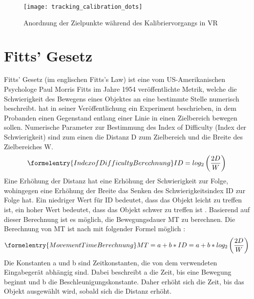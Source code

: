 \begin{figure}[!htbp]
	\centering
	\texttt{[image: tracking\_calibration\_dots]}
	\caption[Anordnung der Zielpunkte während des Kalibriervorgangs in VR]{Anordnung der Zielpunkte während des Kalibriervorgangs in \ac{VR}}
	\label{fig:Calibration-targets}
\end{figure}

\section{Fitts' Gesetz}
\label{section:FittsLaw}
Fitts' Gesetz (im englischen Fitts's Law) ist eine vom US-Amerikanischen Psychologe Paul Morris Fitts im Jahre 1954 veröffentlichte Metrik, welche die Schwierigkeit des Bewegens eines Objektes an eine bestimmte Stelle numerisch beschreibt. \citeauthor{Fitts.1992} hat in seiner Veröffentlichung ein Experiment beschrieben, in dem Probanden einen Gegenstand entlang einer Linie in einen Zielbereich bewegen sollen. Numerische Parameter zur Bestimmung des \glqq Index of Difficulty\grqq{} (Index der Schwierigkeit) sind zum einen die Distanz D zum Zielbereich und die Breite des Zielbereiches W. \cite{Fitts.1992}
\begin{equation}\formelentry{Index of Difficulty Berechnung}
ID = log_2 \left ( \frac{2D}{W} \right )
\end{equation}
Eine Erhöhung der Distanz hat eine Erhöhung der Schwierigkeit zur Folge, wohingegen eine Erhöhung der Breite das Senken des Schwierigkeitsindex ID zur Folge hat. Ein niedriger Wert für ID bedeutet, dass das Objekt leicht zu treffen ist, ein hoher Wert bedeutet, dass das Objekt schwer zu treffen ist \cite{Fitts.1992}. 
Basierend auf dieser Berechnung ist es möglich, die Bewegungsdauer \ac{MT} zu berechnen. Die Berechnung von \ac{MT} ist nach \citeauthor{Graham.1996} mit folgender Formel möglich \cite{Graham.1996}:
\begin{equation}\formelentry{Movement Time Berechnung}
MT = a + b * ID = a + b * log_2 \left ( \frac{2D}{W} \right )
\end{equation}
Die Konstanten a und b sind Zeitkonstanten, die von dem verwendeten Eingabegerät abhängig sind. Dabei beschreibt a die Zeit, bis eine Bewegung beginnt und b die Beschleunigungskonstante. Daher erhöht sich die Zeit, bis das Objekt ausgewählt wird, sobald sich die Distanz erhöht. \cite{Graham.1996}

